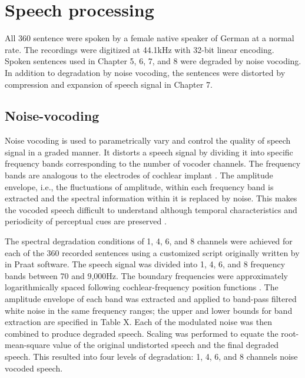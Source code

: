\documentclass[a4paper, nobind]{templates/ociamthesis}
\begin{document}
\hypertarget{speech-processing}{%
\section{Speech processing}\label{speech-processing}}

All 360 sentence were spoken by a female native speaker of German at a normal rate.
The recordings were digitized at 44.1kHz with 32-bit linear encoding.
Spoken sentences used in Chapter 5, 6, 7, and 8 were degraded by noise vocoding.
In addition to degradation by noise vocoding, the sentences were distorted by compression and expansion of speech signal in Chapter 7.

\hypertarget{noise-vocoding}{%
\subsection{Noise-vocoding}\label{noise-vocoding}}

Noise vocoding is used to parametrically vary and control the quality of speech signal in a graded manner.
It distorts a speech signal by dividing it into specific frequency bands corresponding to the number of vocoder channels.
The frequency bands are analogous to the electrodes of cochlear implant \autocite{Shannon1995,Loizou1999,Shannon2004}.
The amplitude envelope, i.e., the fluctuations of amplitude, within each frequency band is extracted and the spectral information within it is replaced by noise.
This makes the vocoded speech difficult to understand although temporal characteristics and periodicity of perceptual cues are preserved \autocite{Rosen1999}.

The spectral degradation conditions of 1, 4, 6, and 8 channels were achieved for each of the 360 recorded sentences using a customized script originally written by \textcite{Darwin2005} in Praat software.
The speech signal was divided into 1, 4, 6, and 8 frequency bands between 70 and 9,000Hz.
The boundary frequencies were approximately logarithmically spaced following cochlear-frequency position functions \autocite{Greenwood1990,Erb2014}.
The amplitude envelope of each band was extracted and applied to band-pass filtered white noise in the same frequency ranges;
the upper and lower bounds for band extraction are specified in Table X.
Each of the modulated noise was then combined to produce degraded speech.
Scaling was performed to equate the root-mean-square value of the original undistorted speech and the final degraded speech.
This resulted into four levels of degradation: 1, 4, 6, and 8 channels noise vocoded speech.
\end{document}

